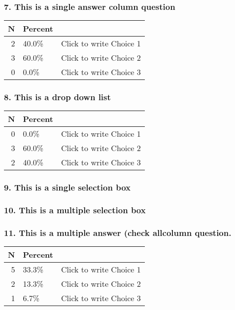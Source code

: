 \documentclass{article}\usepackage[]{graphicx}\usepackage[]{color}
\begin{document}
\hfill \break \hfill \break
\subsubsection*{7.
This is a single answer column question}

\begin{tabular}{r|l|l}
\hline
N & Percent & \\
\hline
2 & 40.0\% & Click to write Choice 1\\
\hline
3 & 60.0\% & Click to write Choice 2\\
\hline
0 & 0.0\% & Click to write Choice 3\\
\hline
\end{tabular}


\hfill \break \hfill \break
\subsubsection*{8.
This is a drop down list}

\begin{tabular}{r|l|l}
\hline
N & Percent & \\
\hline
0 & 0.0\% & Click to write Choice 1\\
\hline
3 & 60.0\% & Click to write Choice 2\\
\hline
2 & 40.0\% & Click to write Choice 3\\
\hline
\end{tabular}


\hfill \break \hfill \break
\subsubsection*{9.
This is a single selection box}

\hfill \break \hfill \break
\subsubsection*{10.
This is a multiple selection box}

\hfill \break \hfill \break
\subsubsection*{11.
This is a multiple answer (check allcolumn question.}

\begin{tabular}{r|l|l}
\hline
N & Percent & \\
\hline
5 & 33.3\% & Click to write Choice 1\\
\hline
2 & 13.3\% & Click to write Choice 2\\
\hline
1 & 6.7\% & Click to write Choice 3\\
\hline
\end{tabular}
\end{document}
